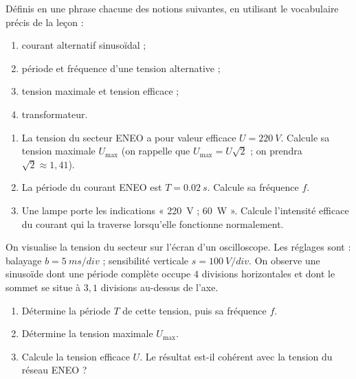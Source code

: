 \documentclass[11pt]{article}
\newcounter{popsec}
\newcounter{popsub}
\newcommand{\courssub}[1]{%
  \stepcounter{popsub}%
  \par\vspace{9pt}\noindent{\popxbold\fontsize{11.5}{13}\selectfont\color{popink}{\color{poporange}\thepopsec.\thepopsub}\hspace{6pt}#1}\par\nopagebreak\vspace{4pt}
}
\begin{document}
\begin{exercice}[Définitions]
Définis en une phrase chacune des notions suivantes, en utilisant le vocabulaire précis de la leçon :
\begin{enumerate}
\item courant alternatif sinusoïdal ;
\item période et fréquence d'une tension alternative ;
\item tension maximale et tension efficace ;
\item transformateur.
\end{enumerate}
\end{exercice}

\begin{exercice}
\begin{enumerate}
\item La tension du secteur ENEO a pour valeur efficace $U = \SI{220}{V}$. Calcule sa tension maximale $U_{\max}$ (on rappelle que $U_{\max} = U\sqrt{2}$ ; on prendra $\sqrt{2} \approx 1{,}41$).
\item La période du courant ENEO est $T = \SI{0,02}{s}$. Calcule sa fréquence $f$.
\item Une lampe porte les indications « \SI{220}{V} ; \SI{60}{W} ». Calcule l'intensité efficace du courant qui la traverse lorsqu'elle fonctionne normalement.
\end{enumerate}
\end{exercice}

\courssub{Je m'entraîne}

\begin{exercice}
On visualise la tension du secteur sur l'écran d'un oscilloscope. Les réglages sont : balayage $b = \SI{5}{ms/div}$ ; sensibilité verticale $s = \SI{100}{V/div}$. On observe une sinusoïde dont une période complète occupe $4$ divisions horizontales et dont le sommet se situe à $3{,}1$ divisions au-dessus de l'axe.
\begin{enumerate}
\item Détermine la période $T$ de cette tension, puis sa fréquence $f$.
\item Détermine la tension maximale $U_{\max}$.
\item Calcule la tension efficace $U$. Le résultat est-il cohérent avec la tension du réseau ENEO ?
\end{enumerate}
\end{exercice}
\end{document}
